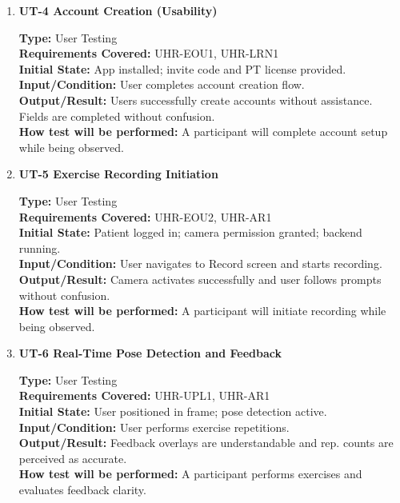 \documentclass[12pt, titlepage]{article}
\begin{document}
\begin{enumerate}
\vspace{0.5em}

\item \textbf{UT-4 Account Creation (Usability)}

\textbf{Type:} User Testing \\
\textbf{Requirements Covered:} UHR-EOU1, UHR-LRN1 \\
\textbf{Initial State:} App installed; invite code and PT license provided. \\
\textbf{Input/Condition:} User completes account creation flow. \\
\textbf{Output/Result:} Users successfully create accounts without assistance. Fields are completed without confusion. \\
\textbf{How test will be performed:} A participant will complete account setup while being observed. \\

\vspace{0.5em}

\item \textbf{UT-5 Exercise Recording Initiation}

\textbf{Type:} User Testing \\
\textbf{Requirements Covered:} UHR-EOU2, UHR-AR1 \\
\textbf{Initial State:} Patient logged in; camera permission granted; backend running. \\
\textbf{Input/Condition:} User navigates to Record screen and starts recording. \\
\textbf{Output/Result:} Camera activates successfully and user follows prompts without confusion. \\
\textbf{How test will be performed:} A participant will initiate recording while being observed. \\

\vspace{0.5em}

\item \textbf{UT-6 Real-Time Pose Detection and Feedback}

\textbf{Type:} User Testing \\
\textbf{Requirements Covered:} UHR-UPL1, UHR-AR1 \\
\textbf{Initial State:} User positioned in frame; pose detection active. \\
\textbf{Input/Condition:} User performs exercise repetitions. \\
\textbf{Output/Result:} Feedback overlays are understandable and rep. counts are perceived as accurate. \\
\textbf{How test will be performed:} A participant performs exercises and evaluates feedback clarity. \\


\end{enumerate}
\end{document}

